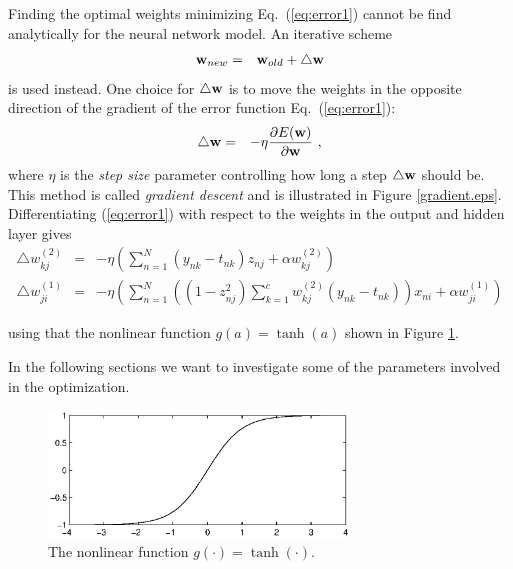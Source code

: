\documentclass[12pt]{article}
\def\w{{\bf w}}
\begin{document}
Finding the optimal weights minimizing Eq.\ (\ref{eq:error1}) cannot be find analytically for the neural network model. An iterative scheme
\begin{eqnarray}
  \label{eq:gradient}
  \w_{new} &=&  \w_{old}+ \triangle \w 
\end{eqnarray}
is used instead. One choice for $\triangle \w$ is to move the weights in
 the opposite direction of the gradient of the error function Eq.\
(\ref{eq:error1}):
\begin{eqnarray}
  \label{eq:gradient}
  \triangle \w &=&  -\eta\frac{\partial E(\w)}{\partial \w} \ ,
\end{eqnarray}
where $\eta$ is the \emph{step size} parameter controlling
how long a step $\triangle \w$ should be. 
This method is called \emph{gradient descent} and is illustrated in Figure
\ref{gradient.eps}. Differentiating (\ref{eq:error1}) with
respect to the weights in the output and hidden layer gives
\begin{eqnarray}
  \label{eq:output}
  \triangle w_{kj}^{(2)} &=&  -\eta \left( \sum_{n=1}^N (y_{nk}-t_{nk}) z_{nj} + \alpha w^{(2)}_{kj} \right) \\
  \label{eq:hidden}
  \triangle w_{ji}^{(1)} &=&  -\eta \left( \sum_{n=1}^N\left((1-z^2_{nj})\sum_{k=1}^{c}w_{kj}^{(2)}(y_{nk}-t_{nk})\right)x_{ni} + \alpha w_{ji}^{(1)} \right)
\end{eqnarray}
%

%
using that the nonlinear function $g(a)=\tanh(a)$ shown in Figure
\ref{tanh.eps}.

In the following sections we want to investigate some of the
parameters involved in the optimization.

\begin{figure}[ht]
\center
\includegraphics[width=8cm]{tanh.eps}
\caption{The nonlinear function $g(\cdot) = \tanh(\cdot)$.} \label{tanh.eps}
\end{figure}
\end{document}
